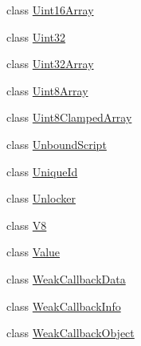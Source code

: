 \begin{DoxyCompactItemize}
\item 
class \hyperlink{classv8_1_1_uint16_array}{Uint16\+Array}
\item 
class \hyperlink{classv8_1_1_uint32}{Uint32}
\item 
class \hyperlink{classv8_1_1_uint32_array}{Uint32\+Array}
\item 
class \hyperlink{classv8_1_1_uint8_array}{Uint8\+Array}
\item 
class \hyperlink{classv8_1_1_uint8_clamped_array}{Uint8\+Clamped\+Array}
\item 
class \hyperlink{classv8_1_1_unbound_script}{Unbound\+Script}
\item 
class \hyperlink{classv8_1_1_unique_id}{Unique\+Id}
\item 
class \hyperlink{classv8_1_1_unlocker}{Unlocker}
\item 
class \hyperlink{classv8_1_1_v8}{V8}
\item 
class \hyperlink{classv8_1_1_value}{Value}
\item 
class \hyperlink{classv8_1_1_weak_callback_data}{Weak\+Callback\+Data}
\item 
class \hyperlink{classv8_1_1_weak_callback_info}{Weak\+Callback\+Info}
\item 
class \hyperlink{classv8_1_1_weak_callback_object}{Weak\+Callback\+Object}
\end{DoxyCompactItemize}

